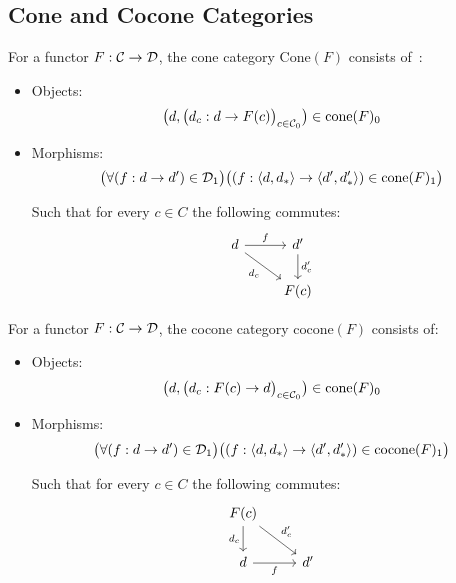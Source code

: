 \subsection{Cone and Cocone Categories}
\begin{definition}
  For a functor $F:\mathcal{C}\to \mathcal{D}$, the cone category $\mathrm{Cone}(F)$ consists
  of~\parencite{fong_spivak:7sketches}:
  \begin{itemize}
    \item Objects:
      \[\big(d, \big(d_c: d \to F(c)\big)_{c\in \mathcal{C}_0}\big)\in
        \mathrm{cone}(F)_0\]
    \item Morphisms:
      \[\big(\forall (f : d \to d') \in \mathcal{D}_1\big)
        \big((f: \langle d, d_*\rangle\to \langle d', d'_*\rangle) \in \mathrm{cone}(F)_1\big)\]

      Such that for every $c\in C$ the following commutes:
      \[\begin{tikzcd}
        d & {d'} \\
        & {F(c)}
        \arrow["{d_c}"', from=1-1, to=2-2]
        \arrow["{d'_c}", from=1-2, to=2-2]
        \arrow["f", from=1-1, to=1-2]
      \end{tikzcd}\]
  \end{itemize}
\end{definition}

\begin{definition}
  For a functor $F:\mathcal{C}\to \mathcal{D}$, the cocone category $\mathrm{cocone}(F)$ consists
  of:

  \begin{itemize}
    \item Objects:
      \[\big(d, \big(d_c: F(c) \to d\big)_{c\in \mathcal{C}_0}\big)\in
        \mathrm{cone}(F)_0\]
    \item Morphisms:
      \[\big(\forall (f : d\to d')\in \mathcal{D}_1\big)
        \big((f:\langle d, d_*\rangle\to \langle d', d'_*\rangle)\in \mathrm{cocone}(F)_1\big)\]

      Such that for every $c\in C$ the following commutes:
      \[\begin{tikzcd}[ampersand replacement=\&]
        {F(c)} \\
        d \& {d'}
        \arrow["{d_c}"', from=1-1, to=2-1]
        \arrow["{d'_c}", from=1-1, to=2-2]
        \arrow["f"', from=2-1, to=2-2]
      \end{tikzcd}\]
  \end{itemize}
\end{definition}